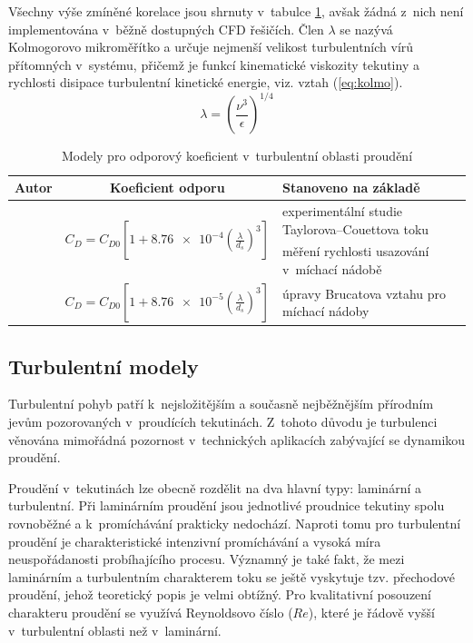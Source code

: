 Všechny výše zmíněné korelace jsou shrnuty v~tabulce \ref{tab:cds}, avšak žádná z~nich není implementována v~běžně dostupných CFD řešičích. Člen $\lambda$ se nazývá Kolmogorovo mikroměřítko a určuje nejmenší velikost turbulentních vírů přítomných v~systému, přičemž je funkcí kinematické viskozity tekutiny a rychlosti disipace turbulentní kinetické energie, viz. vztah (\ref{eq:kolmo}).
\begin{equation}
  \lambda = \left( \frac{\nu^{3}}{\epsilon} \right) ^{1/4}
	\label{eq:kolmo}
\end{equation}

\begin{table}[h!]
\small
\centering
\caption{Modely pro odporový koeficient v~turbulentní oblasti proudění}
\label{tab:cds}
\begin{tabular}{cc>{\centering\arraybackslash}p{4.5cm}}
\toprule
\textbf{Autor} & \textbf{Koeficient odporu} & \textbf{Stanoveno na základě} \\
\midrule{}

\multirow{2}{*}{\citet{bru98}} & \multirow{2}{*}{$C_{D} = C_{D0} \left[ 1 + \num{8.76e-4} \left( \frac{\lambda}{d_{s}} \right)^{3} \right] $} & experimentální studie Taylorova–Couettova toku \\ \addlinespace

\multirow{2}{*}{\citet{pin01}} & \multirow{2}{*}{$C_{D} = C_{D0} \left[ \num{0.4}\tanh\left(  \frac{16\lambda}{d_{s}} - 1  \right) \right] ^{-2}$} & měření rychlosti usazování v~míchací nádobě \\ \addlinespace

\multirow{2}{*}{\citet{kho06}} & \multirow{2}{*}{$C_{D} = C_{D0} \left[ 1 + \num{8.76e-5} \left( \frac{\lambda}{d_{s}} \right)^{3} \right]$} & úpravy Brucatova vztahu pro míchací nádoby  \\

\bottomrule
\end{tabular}
\normalsize
\end{table}

\subsection{Turbulentní modely}
Turbulentní pohyb patří k~nejsložitějším a současně nejběžnějším přírodním jevům pozorovaných v~proudících tekutinách. Z~tohoto důvodu je turbulenci věnována mimořádná pozornost v~technických aplikacích zabývající se dynamikou proudění. 

Proudění v~tekutinách lze obecně rozdělit na dva hlavní typy: laminární a turbulentní. Při laminárním proudění jsou jednotlivé proudnice tekutiny spolu rovnoběžné a k~promíchávání prakticky nedochází. Naproti tomu pro turbulentní proudění je charakteristické intenzivní promíchávání a vysoká míra neuspořádanosti probíhajícího procesu. Významný je také fakt, že mezi laminárním a turbulentním charakterem toku se ještě vyskytuje tzv. přechodové proudění, jehož teoretický popis je velmi obtížný. Pro kvalitativní posouzení charakteru proudění se využívá Reynoldsovo číslo ($Re$), které je řádově vyšší v~turbulentní oblasti než v~laminární. 

